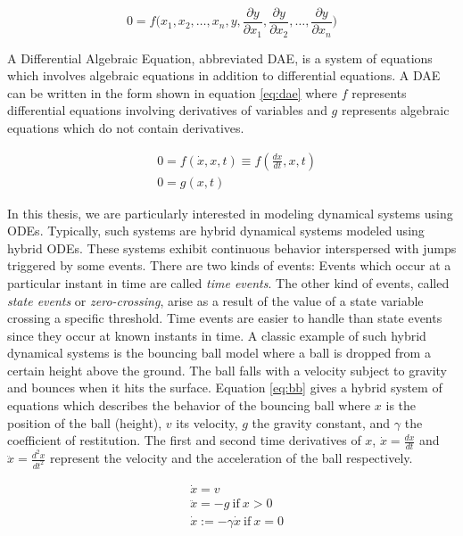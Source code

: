 \begin{equation}
0 = f\biggl(x_1,x_2,\dots, x_n,y,\frac{\partial y}{\partial x_1},\frac{\partial y}{\partial x_2},\dots,\frac{\partial y}{\partial x_n}\biggl)
\label{eq:pde}
\end{equation} 

A Differential Algebraic Equation, abbreviated DAE, is a system of equations which involves algebraic equations in addition to differential equations. A DAE can be written in the form shown in equation \ref{eq:dae} where $f$ represents differential equations involving derivatives of variables and $g$ represents algebraic equations which do not contain derivatives.

\begin{equation}
\begin{aligned}
&0 = f(\dot{x},x,t) \equiv f(\frac{dx}{dt},x,t) \\
&0 = g(x,t)
\end{aligned}
\label{eq:dae}
\end{equation}
  
In this thesis, we are particularly interested in modeling dynamical systems using ODEs. Typically, such systems are hybrid dynamical systems modeled using hybrid ODEs. These systems exhibit continuous behavior interspersed with jumps triggered by some events. There are two kinds of events: Events which occur at a particular instant in time are called \textit{time events}. The other kind of events, called \textit{state events} or \textit{zero-crossing}, arise as a result of the value of a state variable crossing a specific threshold. Time events are easier to handle than state events since they occur at known instants in time. A classic example of such hybrid dynamical systems is the bouncing ball model where a ball is dropped from a certain height above the ground. The ball falls with a velocity subject to gravity and bounces when it hits the surface. Equation \ref{eq:bb} gives a hybrid system of equations which describes the behavior of the bouncing ball where $x$ is the position of the ball (height), $v$ its velocity, $g$ the gravity constant, and $\gamma$ the coefficient of restitution. The first and second time derivatives of $x$, $\dot{x} = \frac{dx}{dt}$ and $\ddot{x} = \frac{d^2x}{dt^2}$ represent the velocity and the acceleration of the ball respectively. 

\begin{equation}
\begin{aligned}
&\dot{x} = v\\
&\ddot{x} = -g\ \text{if}\ x > 0\\
&\dot{x} := -\gamma \dot{x}\ \text{if}\ x = 0 
\end{aligned}
\label{eq:bb}
\end{equation}  


